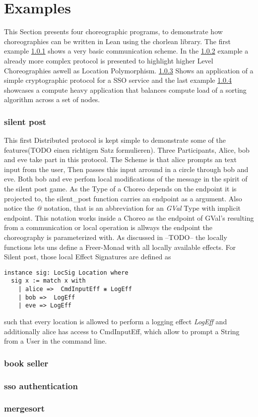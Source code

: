 \chapter{Examples}

This Section presents four choreographic programs, to demonstrate how choreographies can be written in Lean using the chorlean library. The first example \ref{ss:silent} shows a very basic communication scheme. In the \ref{ss:book} example a already more complex protocol is presented to highlight higher Level Choreographies aswell as Location Polymorphism. \ref{ss:sso} Shows an application of a simple cryptographic protocol for a SSO service and the last example \ref{ss:merge} showcases a compute heavy application that balances compute load of a sorting algorithm across a set of  nodes.

\subsection{silent post}
\label{ss:silent}
This first Distributed protocol is kept simple to demonstrate some of the features(TODO einen richtigen Satz formulieren).
Three Participants, Alice, bob and eve take part in this protocol. The Scheme is that alice prompts an text input from the user, Then passes this input arround in a circle through bob and eve. Both bob and eve perfom local modifications of the message in the spirit of the silent post game.
%
As the Type of a Choreo depends on the endpoint it is projected to, the silent_post function carries an endpoint as a argument. Also notice the \emph{@} notation, that is an abbreviation for an \emph{GVal} Type with implicit endpoint. This notation works inside a Choreo as the endpoint of GVal's resulting from a communication or local operation is allways the endpoint the choreography is parameterized with.
As discussed in --TODO-- the locally functions lets uns define a Freer-Monad with all locally available effects. For Silent post, those local Effect Signatures are defined as
\begin{lstlisting}[language=lean]
instance sig: LocSig Location where
  sig x := match x with
    | alice =>  CmdInputEff ⨳ LogEff
    | bob =>  LogEff
    | eve => LogEff
\end{lstlisting}
such that every location is allowed to perform a logging effect \emph{LogEff} and additionally alice has access to CmdInputEff, which allow to prompt a String from a User in the command line.


\subsection{book seller}
\label{ss:book}


\subsection{sso authentication}
\label{ss:sso}


\subsection{mergesort}
\label{ss:merge}

%
